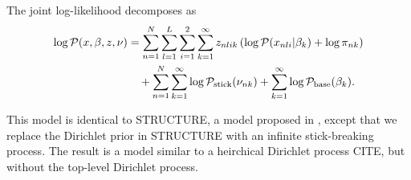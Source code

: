 \begin{ex}
The joint log-likelihood decomposes as
\begin{align*}
\log \mathcal{P}(x, \beta, z, \nu) &=
\sum_{n=1}^N \sum_{l=1}^L \sum_{i = 1}^2 \sum_{k=1}^{\infty}
        z_{nlik} \left(
            \log \mathcal{P}(x_{nli} \vert \beta_{k}) + \log \pi_{nk}
        \right)
\nonumber\\&
    \quad +
    \sum_{n=1}^N \sum_{k=1}^{\infty} \log \mathcal{P}_{\mathrm{stick}}(\nu_{nk})
    + \sum_{k=1}^{\infty} \log \mathcal{P}_{\mathrm{base}}(\beta_{k}).
\end{align*}

This model is identical to STRUCTURE,
a model proposed in \citet{pritchard:2000:structure, raj:2014:faststructure},
except that we replace the Dirichlet prior in STRUCTURE
with an infinite stick-breaking process.
The result is a model similar to a heirchical Dirichlet process CITE,
but without the top-level Dirichlet process.

\end{ex}


